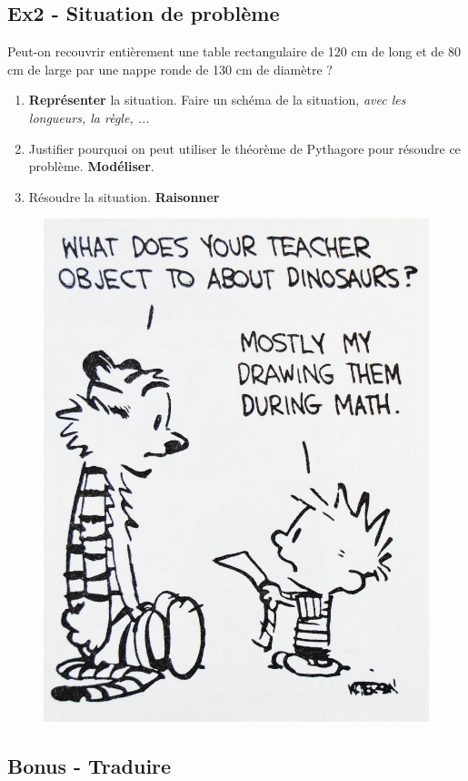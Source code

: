 \documentclass[12pt]{article}
\begin{document}
\subsection*{Ex2 - Situation de problème}

Peut-on recouvrir entièrement une table rectangulaire de 120 cm de long et de 80 cm de large par une nappe ronde de 130 cm de diamètre ?

\begin{enumerate}
\item[1.] \textbf{Représenter} la situation. Faire un schéma de la situation, \textit{avec les longueurs, la règle, ...}
\item[2.] Justifier pourquoi on peut utiliser le théorème de Pythagore pour résoudre ce problème. \textbf{Modéliser}. 
\item[3.] Résoudre la situation. \textbf{Raisonner}
\end{enumerate}

\begin{multicols}{2}
  \begin{figure}[H]
    \centering
    \includegraphics[width=0.6 \linewidth]{4x1-pythagore/sources/cah.jpg}
  \end{figure}

  \subsection*{Bonus - Traduire}

\end{multicols}
\end{document}
